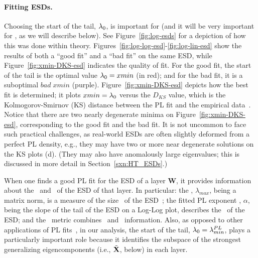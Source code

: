 
\paragraph{Fitting ESDs.}
Choosing the start of the tail, $\lambda_{0}$, is important for \HTSR (and it will be very important for \SETOL, as we will describe below).
See Figure~\ref{fig:log-esds} for a depiction of how this was done within \HTSR theory.
Figures~\ref{fig:log-log-esd}-\ref{fig:log-lin-esd} show the results of both a ``good fit'' and a ``bad fit'' on the same ESD,
while Figure~\ref{fig:xmin-DKS-esd} indicates the quality of fit.
For the good fit, the start of the tail is the optimal value $\lambda_{0}=xmin$ (in red); and for the bad fit, it is a suboptimal $bad\;xmin$ (purple).
Figure~\ref{fig:xmin-DKS-esd} depicts how the best fit is determined; it plots $xmin=\lambda_{0}$ versus the $D_{KS}$ 
value, which is the Kolmogorov-Smirnov (KS) distance between the PL fit and the empirical data~\cite{CSN09_powerlaw}.
Notice that there are two nearly degenerate minima on Figure~\ref{fig:xmin-DKS-esd}, corresponding to the good fit and the bad fit. 
It is not uncommon to face such practical challenges, as real-world ESDs are often slightly deformed from a perfect PL density, e.g.,
they may have two or more near degenerate solutions on the KS plots (d).
(They may also have anomalously large eigenvalues; this is discussed in more detail in Section~\ref{sxn:HT_ESDs}.)


When one finds a good PL fit for the ESD of a layer $\mathbf{W}$,
it provides information about the \SHAPE~and \SCALE~of the ESD of that layer.
In particular: 
the \SPECTRALNORM, $\lambda_{max}$, being a matrix norm, is a measure of the size \SCALE~of the ESD~\cite{MM21a_simpsons_TR}; 
the fitted PL exponent \ALPHA, $\alpha$, being the slope of the tail of the ESD on a Log-Log plot, describes the \SHAPE~of the ESD; and
the \WW \ALPHAHAT~metric combines \SHAPE~and \SCALE~information.
Also, as opposed to other applications of PL fits~\cite{CSN09_powerlaw,BouchaudPotters03}, in our analysis,
the start of the tail, $\lambda_{0}=\lambda^{PL}_{min}$, plays a particularly important role because it
identifies the subspace of the strongest generalizing eigencomponents (i.e., $\tilde{\mathbf{X}}$, below) in each layer.

